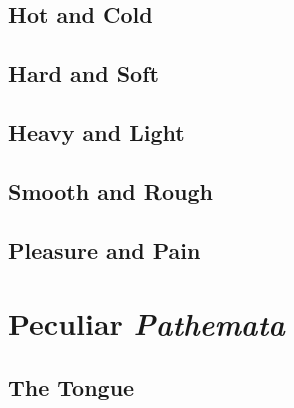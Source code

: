 \subsection{Hot and Cold} %
\label{sub:hot_and_cold}




\subsection{Hard and Soft} %
\label{sub:hard_and_soft}




\subsection{Heavy and Light} %
\label{sub:heavy_and_light}




\subsection{Smooth and Rough} %
\label{sub:smooth_and_rough}




\subsection{Pleasure and Pain} %
\label{sub:pleasure_and_pain}






\section{Peculiar \emph{Pathemata}} %
\label{sec:peculiar_emph_pathemata}

\subsection{The Tongue} %
\label{sub:the_tongue}




